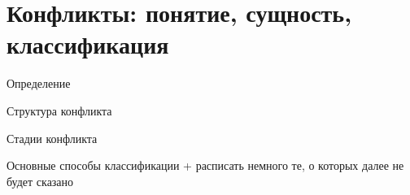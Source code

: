 \chapter{Конфликты: понятие, сущность, классификация}

Определение

Структура конфликта

Стадии конфликта

Основные способы классификации + расписать немного те, о которых далее не будет
сказано
